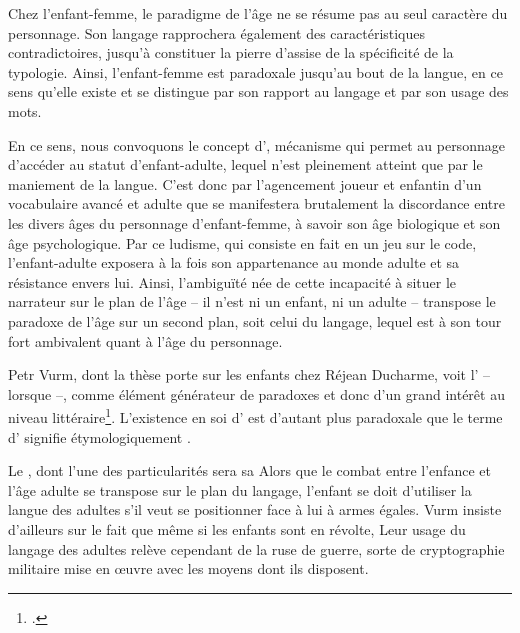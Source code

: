 Chez l'enfant-femme, le paradigme de l'âge ne se résume pas au seul caractère du personnage.
Son langage rapprochera également des caractéristiques contradictoires, jusqu'à constituer la pierre d'assise de la spécificité de la typologie.
Ainsi, l'enfant-femme est paradoxale jusqu'au bout de la langue, en ce sens qu'elle existe et se distingue par son rapport au langage et par son usage des mots.
\par
En ce sens, nous convoquons le concept d', mécanisme qui permet au personnage d'accéder au statut d'enfant-adulte, lequel n'est pleinement atteint que par le maniement de la langue.
C'est donc par l'agencement joueur et enfantin d'un vocabulaire avancé et adulte que se manifestera brutalement la discordance entre les divers âges du personnage d'enfant-femme, à savoir son âge biologique et son âge psychologique.
Par ce ludisme, qui consiste en fait en un jeu sur le code, l'enfant-adulte exposera à la fois son appartenance au monde adulte et sa résistance envers lui.
Ainsi, l'ambiguïté née de cette incapacité à situer le narrateur sur le plan de l'âge -- il n'est ni un enfant, ni un adulte -- transpose le paradoxe de l'âge sur un second plan, soit celui du langage, lequel est à son tour fort ambivalent quant à l'âge du personnage.
\par
Petr Vurm, dont la thèse porte sur les enfants chez Réjean Ducharme, voit l' -- lorsque  --, comme élément générateur de paradoxes et donc d'un grand intérêt au niveau littéraire\footcite[97]{Vurm2014}.
L'existence en soi d' est d'autant plus paradoxale que le terme d' signifie étymologiquement .
\par
Le , dont l'une des particularités sera sa 
Alors que le combat entre l'enfance et l'âge adulte se transpose sur le plan du langage, l'enfant se doit d'utiliser la langue des adultes s'il veut se positionner face à lui à armes égales.
Vurm insiste d'ailleurs sur le fait que même si les enfants sont en révolte, 
Leur usage du langage des adultes relève cependant de la ruse de guerre, sorte de cryptographie militaire mise en \oe{}uvre avec les moyens dont ils disposent.



